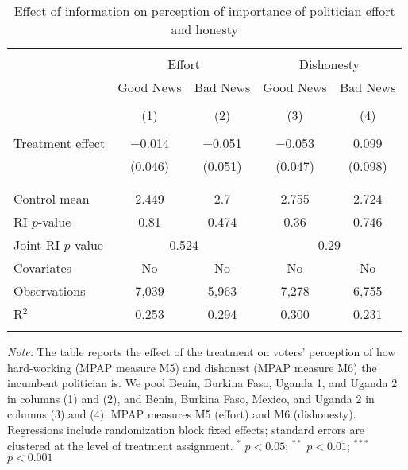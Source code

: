 
\begin{table}[!htbp] \centering 
  \caption{Effect of information on perception of importance of politician effort and honesty} 
  \label{effort_honesty} 
\begin{tabular}{@{\extracolsep{1pt}}lcccc} 
\\[-1.8ex]\hline 
\hline \\[-1.8ex] 
 & \multicolumn{2}{c}{Effort}&\multicolumn{2}{c}{Dishonesty} \\ 
\cline{2-5} 
 & Good News & Bad News & Good News & Bad News \\ 
\\[-1.8ex] & (1) & (2) & (3) & (4)\\ 
\hline \\[-1.8ex] 
 Treatment effect & $-$0.014 & $-$0.051 & $-$0.053 & 0.099 \\ 
  & (0.046) & (0.051) & (0.047) & (0.098) \\ 
  & & & & \\ 
\hline \\[-1.8ex] 
Control mean & 2.449 & 2.7 & 2.755 & 2.724 \\ 
RI $p$-value & 0.81 & 0.474 & 0.36 & 0.746 \\ 
Joint RI $p$-value & \multicolumn{2}{c}{0.524} & \multicolumn{2}{c}{0.29} \\
Covariates & No & No & No & No \\ 
Observations & 7,039 & 5,963 & 7,278 & 6,755 \\ 
R$^{2}$ & 0.253 & 0.294 & 0.300 & 0.231 \\ 
\hline 
\hline \\[-1.8ex] 
\end{tabular} 
\begin{flushleft}\textit{Note:} The table reports the effect of the treatment on voters' perception of how hard-working (MPAP measure M5) and dishonest (MPAP measure M6) the incumbent politician is. We pool Benin, Burkina Faso, Uganda 1, and Uganda 2 in columns (1) and (2), and Benin, Burkina Faso, Mexico, and Uganda 2 in columns (3) and (4). MPAP measures M5 (effort) and M6 (dishonesty). Regressions include randomization block fixed effects; standard errors are clustered at the level of treatment assignment. $^{*}$ $p<0.05$; $^{**}$ $p<0.01$; $^{***}$ $p<0.001$ \end{flushleft}
\end{table} 
